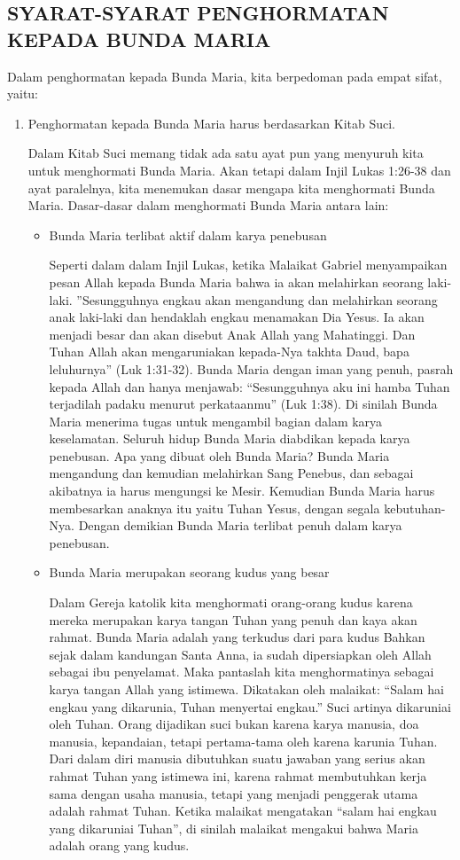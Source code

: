 \subsection*{SYARAT-SYARAT PENGHORMATAN KEPADA BUNDA MARIA}
Dalam penghormatan kepada Bunda Maria, kita berpedoman pada empat sifat, yaitu:
\begin{enumerate}
\item Penghormatan kepada Bunda Maria harus berdasarkan Kitab Suci.

Dalam Kitab Suci memang tidak ada satu ayat pun yang menyuruh kita untuk menghormati Bunda Maria. Akan tetapi dalam Injil Lukas 1:26-38 dan ayat paralelnya, kita menemukan dasar mengapa kita menghormati Bunda Maria. Dasar-dasar dalam menghormati Bunda Maria antara lain:
\begin{itemize}
\item Bunda Maria terlibat aktif dalam karya penebusan

Seperti dalam dalam Injil Lukas, ketika Malaikat Gabriel menyampaikan pesan Allah kepada Bunda Maria bahwa ia akan melahirkan seorang laki-laki. ”Sesungguhnya engkau akan mengandung dan melahirkan seorang anak laki-laki dan hendaklah engkau menamakan Dia Yesus. Ia akan menjadi besar dan akan disebut Anak Allah yang Mahatinggi. Dan Tuhan Allah akan mengaruniakan kepada-Nya takhta Daud, bapa leluhurnya” (Luk 1:31-32). Bunda Maria dengan iman yang penuh, pasrah kepada Allah dan hanya menjawab: “Sesungguhnya aku ini hamba Tuhan terjadilah padaku menurut perkataanmu” (Luk 1:38). Di sinilah Bunda Maria menerima tugas untuk mengambil bagian dalam karya keselamatan. Seluruh hidup Bunda Maria diabdikan kepada karya penebusan. Apa yang dibuat oleh Bunda Maria? Bunda Maria mengandung dan kemudian melahirkan Sang Penebus, dan sebagai akibatnya ia harus mengungsi ke Mesir. Kemudian Bunda Maria harus membesarkan anaknya itu yaitu Tuhan Yesus, dengan segala kebutuhan-Nya. Dengan demikian Bunda Maria terlibat penuh dalam karya penebusan.
\item Bunda Maria merupakan seorang kudus yang besar

Dalam Gereja katolik kita menghormati orang-orang kudus karena mereka merupakan karya tangan Tuhan yang penuh dan kaya akan rahmat. Bunda Maria adalah yang terkudus dari para kudus Bahkan sejak dalam kandungan Santa Anna, ia sudah dipersiapkan oleh Allah sebagai ibu penyelamat. Maka pantaslah kita menghormatinya sebagai karya tangan Allah yang istimewa. Dikatakan oleh malaikat: “Salam hai engkau yang dikarunia, Tuhan menyertai engkau.” Suci artinya dikaruniai oleh Tuhan. Orang dijadikan suci bukan karena karya manusia, doa manusia, kepandaian, tetapi pertama-tama oleh karena karunia Tuhan. Dari dalam diri manusia dibutuhkan suatu jawaban yang serius akan rahmat Tuhan yang istimewa ini, karena rahmat membutuhkan kerja sama dengan usaha manusia, tetapi yang menjadi penggerak utama adalah rahmat Tuhan. Ketika malaikat mengatakan “salam hai engkau yang dikaruniai Tuhan”, di sinilah malaikat mengakui bahwa Maria adalah orang yang kudus.
\end{itemize}



\end{enumerate}
